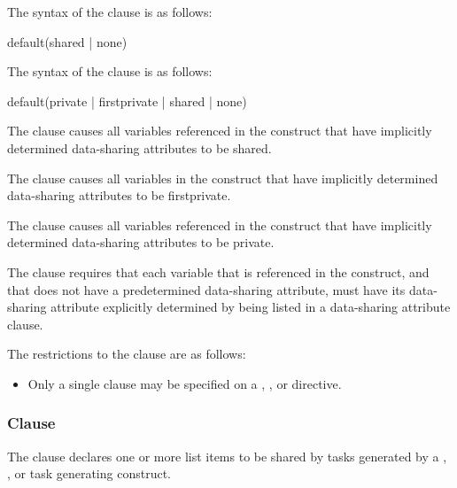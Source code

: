 \syntax
\begin{ccppspecific}
The syntax of the  clause is as follows:

\begin{ompSyntax}
default(shared \textnormal{|} none)
\end{ompSyntax}
\end{ccppspecific}
%
\begin{fortranspecific}
The syntax of the  clause is as follows:

\begin{ompSyntax}
default(private \textnormal{|} firstprivate \textnormal{|} shared \textnormal{|} none)
\end{ompSyntax}
\end{fortranspecific}
%
\descr
The  clause causes all variables referenced in the construct that
have implicitly determined data-sharing attributes to be shared.

\begin{fortranspecific}
The  clause causes all variables in the construct that have
implicitly determined data-sharing attributes to be firstprivate.

The  clause causes all variables referenced in the construct that
have implicitly determined data-sharing attributes to be private.
\end{fortranspecific}

The  clause requires that each variable that is referenced in the
construct, and that does not have a predetermined data-sharing attribute, must have its
data-sharing attribute explicitly determined by being listed in a data-sharing attribute
clause.

\restrictions
The restrictions to the  clause are as follows:

\begin{itemize}
\item Only a single  clause may be specified on a
, ,  or  directive.
\end{itemize}









\subsubsection{ Clause}
\label{subsubsec:shared clause}
\summary
The  clause declares one or more list items to be shared by tasks generated by
a , , or task generating construct.

